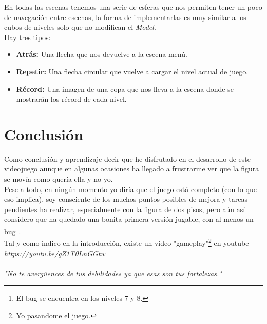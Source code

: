 \documentclass{article}
\begin{document}
En todas las escenas tenemos una serie de esferas que nos permiten tener un poco de navegación entre escenas, la forma de implementarlas es muy similar a los cubos de niveles solo que no modifican el \emph{Model}. \\

Hay tres tipos:
\begin{itemize}
    \item \textbf{Atrás:} Una flecha que nos devuelve a la escena menú.
    \item \textbf{Repetir:} Una flecha circular que vuelve a cargar el nivel actual de juego.
    \item \textbf{Récord:} Una imagen de una copa que nos lleva a la escena donde se mostrarán los récord de cada nivel.
\end{itemize}

\newpage
\section{Conclusión}
Como conclusión y aprendizaje decir que he disfrutado en el desarrollo de este videojuego aunque en algunas ocasiones ha llegado a frustrarme ver que la figura se movía como quería ella y no yo. \\

Pese a todo, en ningún momento yo diría que el juego está completo (con lo que eso implica), soy consciente de los muchos puntos posibles de mejora y tareas pendientes ha realizar, especialmente con la figura de dos pisos, pero aún así considero que ha quedado una bonita primera versión jugable, con al menos un bug\footnote{El bug se encuentra en los niveles 7 y 8.}.\\

Tal y como indico en la introducción, existe un video "gameplay"\footnote{Yo pasandome el juego.} en youtube \emph{https://youtu.be/gZ1T0LnGGtw}\\

---------------------------------------------------------------------\\


\emph{"No te avergüences de tus debilidades ya que esas son tus fortalezas."}
\end{document}
